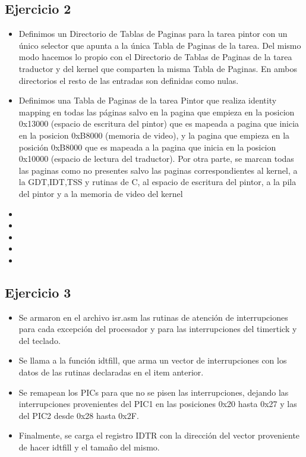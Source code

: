 
\subsection{Ejercicio 2}
\begin{itemize}
 \item Definimos un Directorio de Tablas de Paginas para la tarea pintor con un \'unico selector que apunta a la \'unica Tabla de Paginas de la tarea. Del mismo modo hacemos lo propio con el Directorio de Tablas de Paginas de la tarea traductor y del kernel que comparten la misma Tabla de Paginas. En ambos directorios el resto de las entradas son definidas como nulas.
 \item Definimos una Tabla de Paginas de la tarea Pintor que realiza identity mapping en todas las p\'aginas salvo en la pagina que empieza en la posicion 0x13000 (espacio de escritura del pintor) que es mapeada a pagina que inicia en la posicion 0xB8000 (memoria de video), y la pagina que empieza en la posici\'on 0xB8000 que es mapeada a la pagina que inicia en la posicion 0x10000 (espacio de lectura del traductor). Por otra parte, se marcan todas las paginas como no presentes salvo las paginas correspondientes al kernel, a la GDT,IDT,TSS y rutinas de C, al espacio de escritura del pintor, a la pila del pintor y a la memoria de video del kernel
 \item 
 \item 
 \item 
 \item 
 \item 
\end{itemize}

\subsection{Ejercicio 3}
\begin{itemize}
 \item Se armaron en el archivo isr.asm las rutinas de atenci\'on de interrupciones para cada excepci\'on del procesador y para las interrupciones del timertick y del teclado.
 \item Se llama a la funci\'on idtfill, que arma un vector de interrupciones con los datos de las rutinas declaradas en el item anterior.
 \item Se remapean los PICs para que no se pisen las interrupciones, dejando las interrupciones provenientes del PIC1 en las posiciones 0x20 hasta 0x27 y las del PIC2 desde 0x28 hasta 0x2F.
 \item Finalmente, se carga el registro IDTR con la direcci\'on del vector proveniente de hacer idtfill y el tama\~no del mismo.
\end{itemize}


